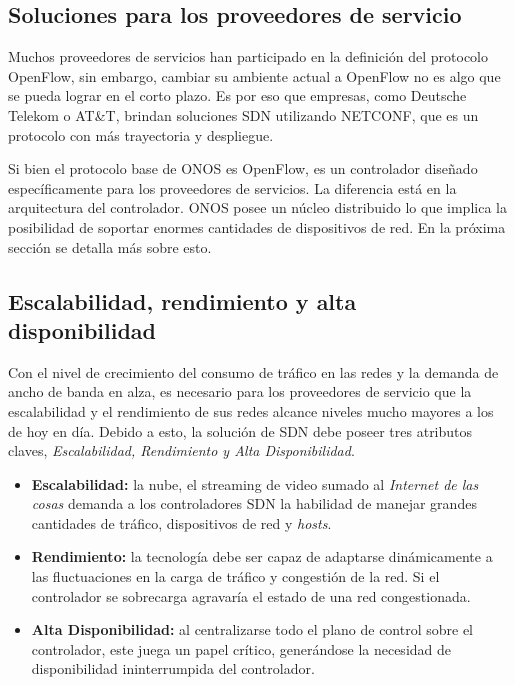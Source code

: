 \subsection{Soluciones para los proveedores de servicio}

Muchos proveedores de servicios han participado en la definición del protocolo OpenFlow, sin embargo, cambiar su ambiente actual a OpenFlow no es algo que se pueda lograr en el corto plazo. Es por eso que empresas, como Deutsche Telekom o AT\&T, brindan soluciones SDN utilizando NETCONF, que es un protocolo con más trayectoria y despliegue. 

Si bien el protocolo base de ONOS es OpenFlow, es un controlador diseñado específicamente para los proveedores de servicios. La diferencia está en la arquitectura del controlador. ONOS posee un núcleo distribuido lo que implica la posibilidad de soportar enormes cantidades de dispositivos de red. En la próxima sección se detalla más sobre esto.

\subsection{Escalabilidad, rendimiento y alta disponibilidad}

Con el nivel de crecimiento del consumo de tráfico en las redes y la demanda de ancho de banda en alza, es necesario para los proveedores de servicio que la escalabilidad y el rendimiento de sus redes alcance niveles mucho mayores a los de hoy en día. Debido a esto, la solución de SDN debe poseer tres atributos claves, \textit{Escalabilidad, Rendimiento y Alta Disponibilidad}.

\begin{itemize}
	\item \textbf{Escalabilidad:} la nube, el streaming de video sumado al \textit{Internet de las cosas} demanda a los controladores SDN la habilidad de manejar grandes cantidades de tráfico, dispositivos de red y \textit{hosts}.
	\item \textbf{Rendimiento:} la tecnología debe ser capaz de adaptarse dinámicamente a las fluctuaciones en la carga de tráfico y congestión de la red. Si el controlador se sobrecarga agravaría el estado de una red congestionada.    
	\item \textbf{Alta Disponibilidad:} al centralizarse todo el plano de control sobre el controlador, este juega un papel crítico, generándose la necesidad de disponibilidad ininterrumpida del controlador.
\end{itemize}


